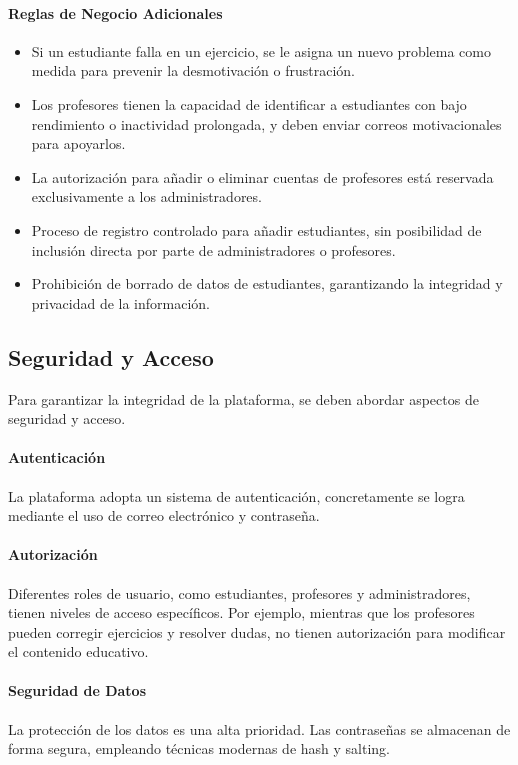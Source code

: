 \paragraph{Reglas de Negocio Adicionales}
\begin{itemize}
\item Si un estudiante falla en un ejercicio, se le asigna un nuevo problema como medida para prevenir la desmotivación o frustración.
\item Los profesores tienen la capacidad de identificar a estudiantes con bajo rendimiento o inactividad prolongada, y deben enviar correos motivacionales para apoyarlos.
\item La autorización para añadir o eliminar cuentas de profesores está reservada exclusivamente a los administradores.
\item Proceso de registro controlado para añadir estudiantes, sin posibilidad de inclusión directa por parte de administradores o profesores.
\item Prohibición de borrado de datos de estudiantes, garantizando la integridad y privacidad de la información.
\end{itemize}

\subsection{Seguridad y Acceso}

Para garantizar la integridad de la plataforma, se deben abordar aspectos de seguridad y acceso.

\paragraph{Autenticación} La plataforma adopta un sistema de autenticación, concretamente se logra mediante el uso de correo electrónico y contraseña. 

\paragraph{Autorización} Diferentes roles de usuario, como estudiantes, profesores y administradores, tienen niveles de acceso específicos. Por ejemplo, mientras que los profesores pueden corregir ejercicios y resolver dudas, no tienen autorización para modificar el contenido educativo.

\paragraph{Seguridad de Datos} La protección de los datos es una alta prioridad. Las contraseñas se almacenan de forma segura, empleando técnicas modernas de hash y salting. 

